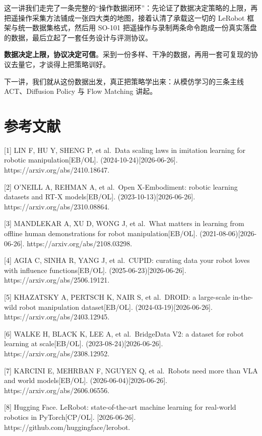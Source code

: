 \documentclass[
  chinese,
]{ctexart}
\begin{document}
这一讲我们走完了一条完整的``操作数据闭环''：先论证了数据决定策略的上限，再把遥操作采集方法铺成一张四大类的地图，接着认清了承载这一切的
LeRobot 框架与统一数据集格式，然后用 SO-101
把遥操作与录制两条命令跑成一份真实落盘的数据，最后立起了一套任务设计与评测协议。

\textbf{数据决定上限，协议决定可信}。采到一份多样、干净的数据，再用一套可复现的协议去量它，才谈得上把策略训好。

下一讲，我们就从这份数据出发，真正把策略学出来：从模仿学习的三条主线
ACT、Diffusion Policy 与 Flow Matching 讲起。

\section{参考文献}\label{ux53c2ux8003ux6587ux732e}

{[}1{]} LIN F, HU Y, SHENG P, et al.~Data scaling laws in imitation
learning for robotic manipulation{[}EB/OL{]}.
(2024-10-24){[}2026-06-26{]}. https://arxiv.org/abs/2410.18647.

{[}2{]} O'NEILL A, REHMAN A, et al.~Open X-Embodiment: robotic learning
datasets and RT-X models{[}EB/OL{]}. (2023-10-13){[}2026-06-26{]}.
https://arxiv.org/abs/2310.08864.

{[}3{]} MANDLEKAR A, XU D, WONG J, et al.~What matters in learning from
offline human demonstrations for robot manipulation{[}EB/OL{]}.
(2021-08-06){[}2026-06-26{]}. https://arxiv.org/abs/2108.03298.

{[}4{]} AGIA C, SINHA R, YANG J, et al.~CUPID: curating data your robot
loves with influence functions{[}EB/OL{]}. (2025-06-23){[}2026-06-26{]}.
https://arxiv.org/abs/2506.19121.

{[}5{]} KHAZATSKY A, PERTSCH K, NAIR S, et al.~DROID: a large-scale
in-the-wild robot manipulation dataset{[}EB/OL{]}.
(2024-03-19){[}2026-06-26{]}. https://arxiv.org/abs/2403.12945.

{[}6{]} WALKE H, BLACK K, LEE A, et al.~BridgeData V2: a dataset for
robot learning at scale{[}EB/OL{]}. (2023-08-24){[}2026-06-26{]}.
https://arxiv.org/abs/2308.12952.

{[}7{]} KARCINI E, MEHRBAN F, NGUYEN Q, et al.~Robots need more than VLA
and world models{[}EB/OL{]}. (2026-06-04){[}2026-06-26{]}.
https://arxiv.org/abs/2606.06556.

{[}8{]} Hugging Face. LeRobot: state-of-the-art machine learning for
real-world robotics in PyTorch{[}CP/OL{]}. {[}2026-06-26{]}.
https://github.com/huggingface/lerobot.
\end{document}
